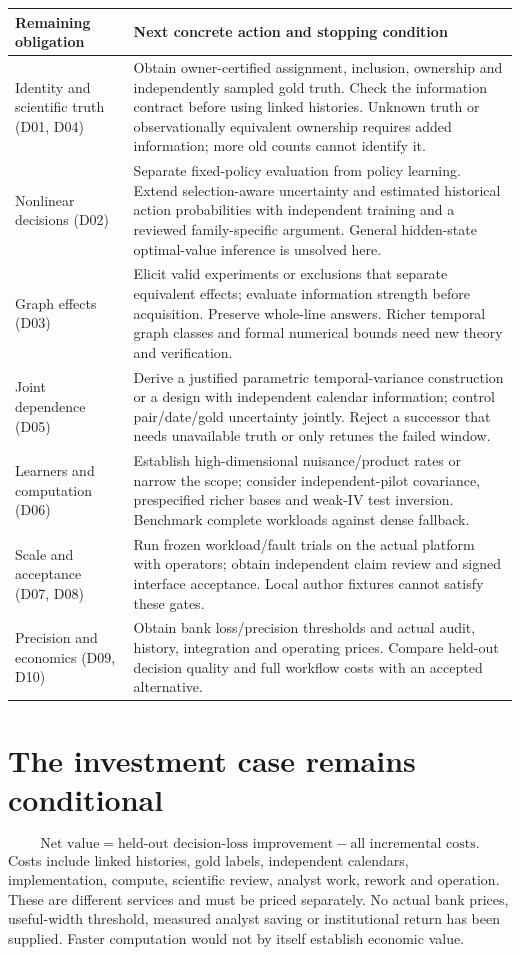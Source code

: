 \documentclass[11pt,a4paper]{article}
\begin{document}
\begin{tabular}{@{}>{\raggedright\arraybackslash}p{}>{\raggedright\arraybackslash}p{}@{}}\toprule
Remaining obligation & Next concrete action and stopping condition\\\midrule
Identity and scientific truth (D01, D04) & Obtain owner-certified assignment, inclusion, ownership and independently sampled gold truth. Check the information contract before using linked histories. Unknown truth or observationally equivalent ownership requires added information; more old counts cannot identify it.\\[5pt]
Nonlinear decisions (D02) & Separate fixed-policy evaluation from policy learning. Extend selection-aware uncertainty and estimated historical action probabilities with independent training and a reviewed family-specific argument. General hidden-state optimal-value inference is unsolved here.\\[5pt]
Graph effects (D03) & Elicit valid experiments or exclusions that separate equivalent effects; evaluate information strength before acquisition. Preserve whole-line answers. Richer temporal graph classes and formal numerical bounds need new theory and verification.\\[5pt]
Joint dependence (D05) & Derive a justified parametric temporal-variance construction or a design with independent calendar information; control pair/date/gold uncertainty jointly. Reject a successor that needs unavailable truth or only retunes the failed window.\\[5pt]
Learners and computation (D06) & Establish high-dimensional nuisance/product rates or narrow the scope; consider independent-pilot covariance, prespecified richer bases and weak-IV test inversion. Benchmark complete workloads against dense fallback.\\[5pt]
Scale and acceptance (D07, D08) & Run frozen workload/fault trials on the actual platform with operators; obtain independent claim review and signed interface acceptance. Local author fixtures cannot satisfy these gates.\\[5pt]
Precision and economics (D09, D10) & Obtain bank loss/precision thresholds and actual audit, history, integration and operating prices. Compare held-out decision quality and full workflow costs with an accepted alternative.\\\bottomrule
\end{tabular}

\section*{The investment case remains conditional}
\[
\text{Net value}=\text{held-out decision-loss improvement}-\text{all incremental costs}.
\]
Costs include linked histories, gold labels, independent calendars, implementation, compute, scientific review, analyst work, rework and operation. These are different services and must be priced separately. No actual bank prices, useful-width threshold, measured analyst saving or institutional return has been supplied. Faster computation would not by itself establish economic value.
\end{document}
